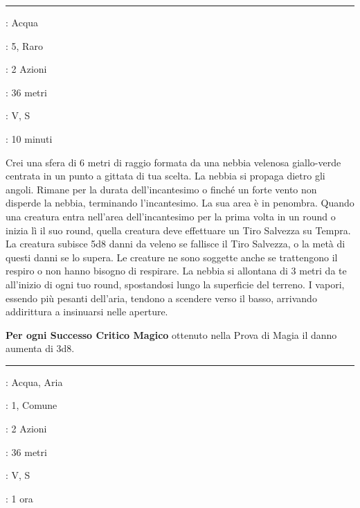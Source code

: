\begin{multicols}{2}
\smallskip\noindent\rule{\linewidth}{2pt} \hypertarget{Nebbia mortale}{}\smallskip{}
\noindent
\begin{description}[noitemsep, topsep=0pt, parsep=0pt, partopsep=0pt, leftmargin=0cm, labelwidth=2.8cm]
	\item[\textbf{Lista di Magia}]: Acqua
	\item[\textbf{Livello}]: 5, Raro
	\item[\textbf{T. di Lancio}]: 2 Azioni
	\item[\textbf{Gittata}]: 36 metri
	\item[\textbf{Componenti}]: V, S
	\item[\textbf{Durata}]: 10 minuti
\end{description}

Crei una sfera di 6 metri di raggio formata da una nebbia velenosa giallo-verde centrata in un punto a gittata di tua scelta. La nebbia si propaga dietro gli angoli. Rimane per la durata dell'incantesimo o finché un forte vento non disperde la nebbia, terminando l'incantesimo. La sua area è in penombra. Quando una creatura entra nell'area dell'incantesimo per la prima volta in un round o inizia lì il suo round, quella creatura deve effettuare un Tiro Salvezza su Tempra. La creatura subisce 5d8 danni da veleno se fallisce il Tiro Salvezza, o la metà di questi danni se lo supera. Le creature ne sono soggette anche se trattengono il respiro o non hanno bisogno di respirare. La nebbia si allontana di 3 metri da te all'inizio di ogni tuo round, spostandosi lungo la superficie del terreno. I vapori, essendo più pesanti dell'aria, tendono a scendere verso il basso, arrivando addirittura a insinuarsi nelle aperture.

\textbf{Per ogni Successo Critico Magico} ottenuto nella Prova di Magia il danno aumenta di 3d8.

\smallskip\noindent\rule{\linewidth}{2pt} \hypertarget{Nube di Nebbia}{}\smallskip{}
\noindent
\begin{description}[noitemsep, topsep=0pt, parsep=0pt, partopsep=0pt, leftmargin=0cm, labelwidth=2.8cm]
	\item[\textbf{Lista di Magia}]: Acqua, Aria
	\item[\textbf{Livello}]: 1, Comune
	\item[\textbf{T. di Lancio}]: 2 Azioni
	\item[\textbf{Gittata}]: 36 metri
	\item[\textbf{Componenti}]: V, S
	\item[\textbf{Durata}]: 1 ora
\end{description}


\end{multicols}
